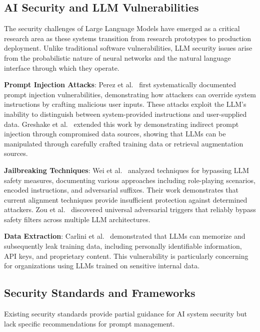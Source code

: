 \subsection{AI Security and LLM Vulnerabilities}

The security challenges of Large Language Models have emerged as a critical research area as these systems transition from research prototypes to production deployment. Unlike traditional software vulnerabilities, LLM security issues arise from the probabilistic nature of neural networks and the natural language interface through which they operate.

\textbf{Prompt Injection Attacks}: Perez et al.~\cite{perez2022ignore} first systematically documented prompt injection vulnerabilities, demonstrating how attackers can override system instructions by crafting malicious user inputs. These attacks exploit the LLM's inability to distinguish between system-provided instructions and user-supplied data. Greshake et al.~\cite{greshake2023more} extended this work by demonstrating indirect prompt injection through compromised data sources, showing that LLMs can be manipulated through carefully crafted training data or retrieval augmentation sources.

\textbf{Jailbreaking Techniques}: Wei et al.~\cite{wei2023jailbroken} analyzed techniques for bypassing LLM safety measures, documenting various approaches including role-playing scenarios, encoded instructions, and adversarial suffixes. Their work demonstrates that current alignment techniques provide insufficient protection against determined attackers. Zou et al.~\cite{zou2023universal} discovered universal adversarial triggers that reliably bypass safety filters across multiple LLM architectures.

\textbf{Data Extraction}: Carlini et al.~\cite{carlini2021extracting} demonstrated that LLMs can memorize and subsequently leak training data, including personally identifiable information, API keys, and proprietary content. This vulnerability is particularly concerning for organizations using LLMs trained on sensitive internal data.

\subsection{Security Standards and Frameworks}

Existing security standards provide partial guidance for AI system security but lack specific recommendations for prompt management.


